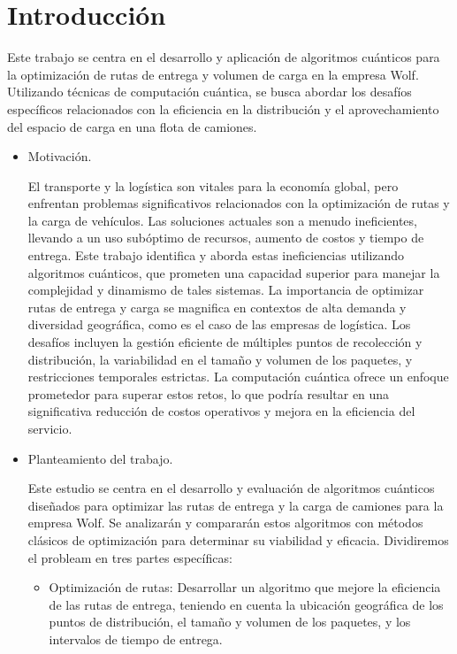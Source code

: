 \documentclass[11pt,a4paper,spanish]{book}
\begin{document}
    \mainmatter
    \chapter{Introducción}


    Este trabajo se centra en el desarrollo y aplicación de algoritmos cuánticos para la optimización de rutas de entrega y volumen de carga en la empresa Wolf. Utilizando técnicas de computación cuántica, se busca abordar los desafíos específicos relacionados con la eficiencia en la distribución y el aprovechamiento del espacio de carga en una flota de camiones.

    \begin{itemize}
        \item Motivación.

        El transporte y la logística son vitales para la economía global, pero enfrentan problemas significativos relacionados con la optimización de rutas y la carga de vehículos. Las soluciones actuales son a menudo ineficientes, llevando a un uso subóptimo de recursos, aumento de costos y tiempo de entrega. Este trabajo identifica y aborda estas ineficiencias utilizando algoritmos cuánticos, que prometen una capacidad superior para manejar la complejidad y dinamismo de tales sistemas.
        La importancia de optimizar rutas de entrega y carga se magnifica en contextos de alta demanda y diversidad geográfica, como es el caso de las empresas de logística. Los desafíos incluyen la gestión eficiente de múltiples puntos de recolección y distribución, la variabilidad en el tamaño y volumen de los paquetes, y restricciones temporales estrictas. La computación cuántica ofrece un enfoque prometedor para superar estos retos, lo que podría resultar en una significativa reducción de costos operativos y mejora en la eficiencia del servicio.

        \item Planteamiento del trabajo.

        Este estudio se centra en el desarrollo y evaluación de algoritmos cuánticos diseñados para optimizar las rutas de entrega y la carga de camiones para la empresa Wolf. Se analizarán y compararán estos algoritmos con métodos clásicos de optimización para determinar su viabilidad y eficacia. Dividiremos el probleam en tres partes específicas:

        \begin{itemize}
            \item Optimización de rutas: Desarrollar un algoritmo que mejore la eficiencia de las rutas de entrega, teniendo en cuenta la ubicación geográfica de los puntos de distribución, el tamaño y volumen de los paquetes, y los intervalos de tiempo de entrega.


\end{itemize}
\end{itemize}
\end{document}
